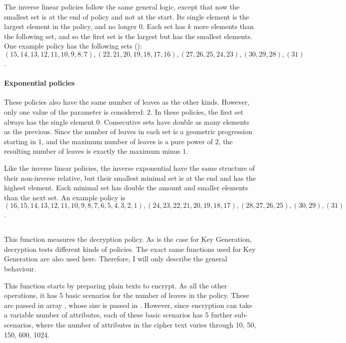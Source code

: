 \documentclass{article}
\begin{document}
The inverse linear policies follow the same general logic, except that now the smallest set is at the end of policy and not at the start. Its single element is the largest element in the policy, and no longer $0$. Each set has $k$ more elements than the following set, and so the first set is the largest but has the smallest elements. One example policy has the following sets (): 
$(15,14,13,12,11,10,9,8,7),(22,21,20,19,18,17,16),(27,26,25,24,23),(30,29,28),(31)$.

\paragraph{Exponential policies}
These policies also have the same number of leaves as the other kinds. However, only one value of the parameter  is considered: $2$. In these policies, the first set always has the single element $0$. Consecutive sets have double as many elements as the previous. Since the number of leaves in each set is a geometric progression starting in $1$, and the maximum number of leaves is a pure power of $2$, the resulting number of leaves is exactly the maximum minus $1$.

Like the inverse linear policies, the inverse exponential have the same structure of their non-inverse relative, but their smallest minimal set is at the end and has the highest element. Each minimal set has double the amount and smaller elements than the next set. An example policy is 
$(16,15,14,13,12,11,10,9,8,7,6,5,4,3,2,1),(24,23,22,21,20,19,18,17),(28,27,26,25),(30,29),(31)$.

\subsection{}
This function measures the decryption policy. As is the case for Key Generation, decryption tests different kinds of policies. The exact same functions used for Key Generation are also used here. Therefore, I will only describe the general behaviour.

This function starts by preparing plain texts to encrypt. As all the other operations, it has 5 basic scenarios for the number of leaves in the policy. These are passed in array , whose size is passed in . However, since encryption can take a variable number of attributes, each of these basic scenarios has 5 further sub-scenarios, where the number of attributes in the cipher text varies through 10, 50, 150, 600, 1024.
\end{document}
